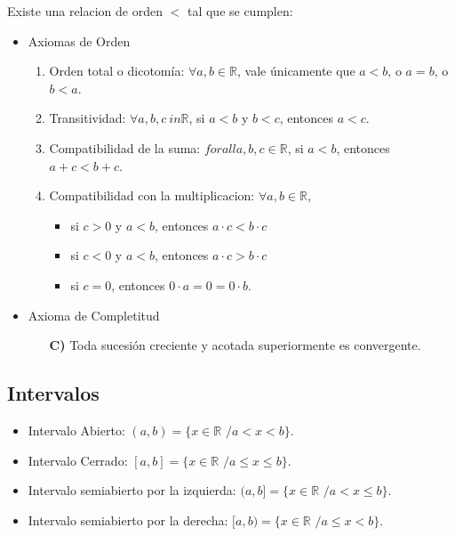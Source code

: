 \documentclass[%
 aip,
 jmp,%
 amsmath,amssymb,
 reprint,%
]{revtex4-1}
\begin{document}
Existe una relacion de orden $<$ tal que se cumplen:

\begin{itemize}
\item Axiomas de Orden
\begin{enumerate}[label=\bfseries o\arabic*)]
\item Orden total o dicotomía: $\forall a,b \in \mathbb{R}$, vale únicamente que $a<b$, o $a=b$, o $b<a$.
\item Transitividad: $\forall a,b,c \ in \mathbb{R}$, si $a<b$ y $b<c$, entonces $a<c$.
\item Compatibilidad de la suma: $forall a,b,c \in \mathbb{R}$, si $a<b$, entonces $a+c < b+c$.
\item Compatibilidad con la multiplicacion: $\forall a,b \in \mathbb{R}$,
\begin{itemize}
\item si $c>0$ y $a<b$, entonces $a \cdot c< b \cdot c$
\item si $c<0$ y $a<b$, entonces $a \cdot c> b \cdot c$
\item si $c=0$, entonces $0 \cdot a = 0 = 0 \cdot b$.
\end{itemize}
\end{enumerate}
\end{itemize}

\begin{itemize}
\item Axioma de Completitud
\begin{itemize}
\item[\bfseries C)] Toda sucesión creciente y acotada superiormente es convergente. 
\end{itemize}
\end{itemize}

\subsection{Intervalos}
\begin{itemize}
\item Intervalo Abierto: $(a, b) = \{x \in \mathbb{R}$ $/  a < x < b\}$.
\item Intervalo Cerrado: $[a, b] = \{x \in \mathbb{R}$ $ / a \leq x \leq b\}$.
\item Intervalo semiabierto por la izquierda: $(a, b] = \{x \in \mathbb{R}$ $ / a < x \leq b\}$.
\item Intervalo semiabierto por la derecha: $[a, b) = \{x \in \mathbb{R}$ $/ a \leq x < b\}$.
\end{itemize}
\end{document}
